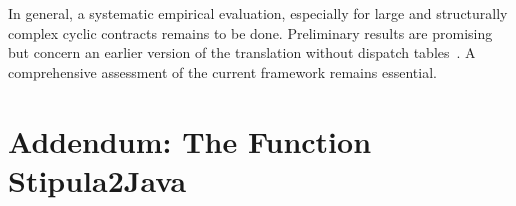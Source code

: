 \documentclass[runningheads]{llncs}
\begin{document}

  In general, a systematic empirical evaluation, especially for large
  and structurally complex cyclic contracts remains to be
  done. Preliminary results are promising but concern an earlier
  version of the translation without dispatch tables~\cite{iFM25}.  A
  comprehensive assessment of the current framework remains essential.


\appendix
\vspace{-.3cm}
\section{Addendum: The Function {\sc Stipula2Java}}
\label{sec:stipula2java}




\end{document}
